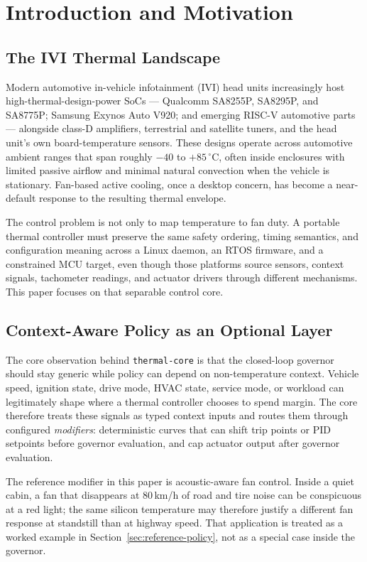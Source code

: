 \section{Introduction and Motivation}

\subsection{The IVI Thermal Landscape}

Modern automotive in-vehicle infotainment (IVI) head units increasingly host high-thermal-design-power SoCs --- Qualcomm SA8255P, SA8295P, and SA8775P; Samsung Exynos Auto V920; and emerging RISC-V automotive parts --- alongside class-D amplifiers, terrestrial and satellite tuners, and the head unit's own board-temperature sensors. These designs operate across automotive ambient ranges that span roughly $-40$ to $+85\,^\circ\mathrm{C}$, often inside enclosures with limited passive airflow and minimal natural convection when the vehicle is stationary. Fan-based active cooling, once a desktop concern, has become a near-default response to the resulting thermal envelope.

The control problem is not only to map temperature to fan duty. A portable thermal controller must preserve the same safety ordering, timing semantics, and configuration meaning across a Linux daemon, an RTOS firmware, and a constrained MCU target, even though those platforms source sensors, context signals, tachometer readings, and actuator drivers through different mechanisms. This paper focuses on that separable control core.

\subsection{Context-Aware Policy as an Optional Layer}

The core observation behind \texttt{thermal-core} is that the closed-loop governor should stay generic while policy can depend on non-temperature context. Vehicle speed, ignition state, drive mode, HVAC state, service mode, or workload can legitimately shape where a thermal controller chooses to spend margin. The core therefore treats these signals as typed context inputs and routes them through configured \emph{modifiers}: deterministic curves that can shift trip points or PID setpoints before governor evaluation, and cap actuator output after governor evaluation.

The reference modifier in this paper is acoustic-aware fan control. Inside a quiet cabin, a fan that disappears at 80\,km/h of road and tire noise can be conspicuous at a red light; the same silicon temperature may therefore justify a different fan response at standstill than at highway speed. That application is treated as a worked example in Section~\ref{sec:reference-policy}, not as a special case inside the governor.

